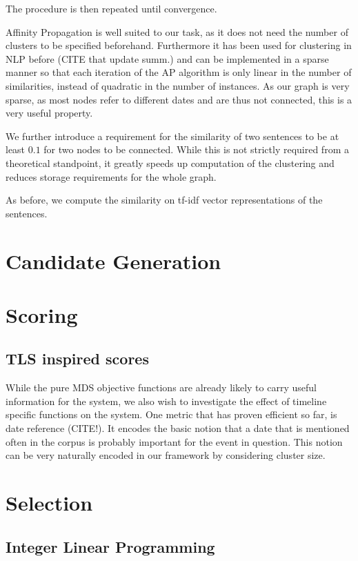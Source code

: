 \documentclass[a4paper,BCOR=10mm]{report}
\begin{document}
The procedure is then repeated until convergence.

Affinity Propagation is well suited to our task, as it does not need the number of clusters to be specified beforehand. Furthermore it has been used for clustering in NLP before (CITE that update summ.) and can be implemented in a sparse manner so that each iteration of the AP algorithm is only linear in the number of similarities, instead of quadratic in the number of instances.
As our graph is very sparse, as most nodes refer to different dates and are thus not connected, this is a very useful property.

We further introduce a requirement for the similarity of two sentences to be at least $0.1$ for two nodes to be connected. While this is not strictly required from a theoretical standpoint, it greatly speeds up computation of the clustering and reduces storage requirements for the whole graph.

As before, we compute the similarity on tf-idf vector representations of the sentences.

\section{Candidate Generation}

\section{Scoring} \label{sec:scoring}

\subsection{TLS inspired scores}

While the pure MDS objective functions are already likely to carry useful information for the system, we also wish to investigate the effect of timeline specific functions on the system.
One metric that has proven efficient so far, is date reference (CITE!). It encodes the basic notion that a date that is mentioned often in the corpus is probably important for the event in question.
This notion can be very naturally encoded in our framework by considering cluster size. %

\section{Selection}

\subsection{Integer Linear Programming}
\end{document}
